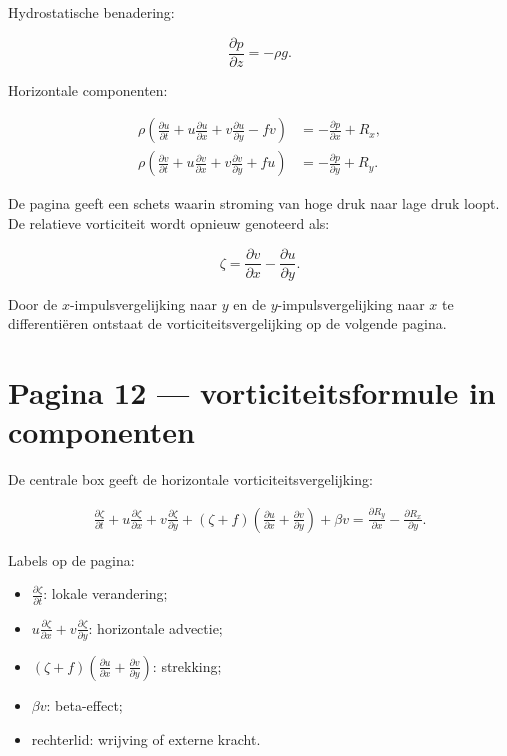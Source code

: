 \documentclass[11pt,a4paper]{article}
\begin{document}
Hydrostatische benadering:

$$
\frac{\partial p}{\partial z}=-\rho g.
$$

Horizontale componenten:

$$
\begin{aligned}
\rho
\left(
\frac{\partial u}{\partial t}
+
u\frac{\partial u}{\partial x}
+
v\frac{\partial u}{\partial y}
-
fv
\right)
&=
-\frac{\partial p}{\partial x}+R_x,\\
\rho
\left(
\frac{\partial v}{\partial t}
+
u\frac{\partial v}{\partial x}
+
v\frac{\partial v}{\partial y}
+
fu
\right)
&=
-\frac{\partial p}{\partial y}+R_y.
\end{aligned}
$$

De pagina geeft een schets waarin stroming van hoge druk naar lage druk loopt. De relatieve vorticiteit wordt opnieuw genoteerd als:

$$
\zeta
=
\frac{\partial v}{\partial x}
-
\frac{\partial u}{\partial y}.
$$

Door de $x$-impulsvergelijking naar $y$ en de $y$-impulsvergelijking naar $x$ te differentiëren ontstaat de vorticiteitsvergelijking op de volgende pagina.

\newpage

\section*{Pagina 12 --- vorticiteitsformule in componenten}
De centrale box geeft de horizontale vorticiteitsvergelijking:

$$
\begin{aligned}
\frac{\partial \zeta}{\partial t}
+
u\frac{\partial \zeta}{\partial x}
+
v\frac{\partial \zeta}{\partial y}
+
(\zeta+f)
\left(
\frac{\partial u}{\partial x}
+
\frac{\partial v}{\partial y}
\right)
+
\beta v
=
\frac{\partial R_y}{\partial x}
-
\frac{\partial R_x}{\partial y}.
\end{aligned}
$$

Labels op de pagina:

\begin{itemize}
  \item $\frac{\partial \zeta}{\partial t}$: lokale verandering;
  \item $u\frac{\partial \zeta}{\partial x}+v\frac{\partial \zeta}{\partial y}$: horizontale advectie;
  \item $(\zeta+f)\left(\frac{\partial u}{\partial x}+\frac{\partial v}{\partial y}\right)$: strekking;
  \item $\beta v$: beta-effect;
  \item rechterlid: wrijving of externe kracht.
\end{itemize}
\end{document}
